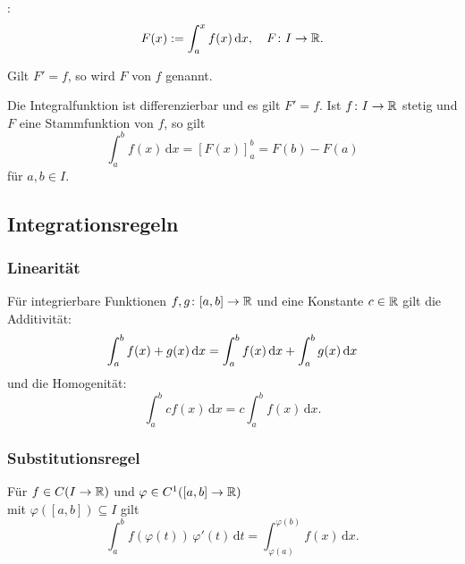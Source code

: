 \begin{definition}[Integralfunktion]\mbox{}\newline
{}:
\begin{equation}
F(x):=\int_a^x f(x)\,\mathrm dx,\quad F\colon I\to\mathbb R.
\end{equation}
\end{definition}

\begin{definition}[Stammfunktion]\mbox{}\newline
Gilt $F'=f$, so wird $F$  von $f$ genannt.
\end{definition}

Die Integralfunktion ist differenzierbar und es gilt $F'=f$.
Ist $f\colon I\to\mathbb R$ stetig und $F$ eine Stammfunktion von $f$,
so gilt
\begin{equation}\label{eq:Hauptsatz}
\int_a^b f(x)\,\mathrm dx = [F(x)]_{a}^{b} = F(b)-F(a)
\end{equation}
für $a,b\in I$.

\subsection{Integrationsregeln}
\subsubsection{Linearität}
Für integrierbare Funktionen $f,g\colon [a,b]\to\mathbb R$ und eine
Konstante $c\in\mathbb R$ gilt die Additivität:
\begin{equation}
\int_a^b f(x)+g(x)\,\mathrm dx
= \int_a^b f(x)\,\mathrm dx+\int_a^b g(x)\,\mathrm dx\\
\end{equation}
und die Homogenität:
\begin{equation}
\int_a^b c f(x)\,\mathrm dx
= c\int_a^b f(x)\,\mathrm dx.
\end{equation}

\subsubsection{Substitutionsregel}
Für $f\in C(I\to\mathbb R)$ und
$\varphi\in C^1([a,b]\to\mathbb R)$\\
mit $\varphi([a,b])\subseteq I$ gilt%
\begin{equation}
\int_a^b f(\varphi(t))\,\varphi'(t)\,\mathrm dt
= \int_{\varphi(a)}^{\varphi(b)} f(x)\,\mathrm dx.
\end{equation}
